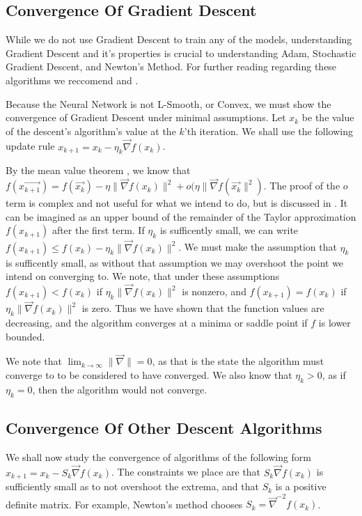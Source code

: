 \documentclass[10pt]{article}
\begin{document}
\subsection{Convergence Of Gradient Descent}
While we do not use Gradient Descent to train any of the models, understanding Gradient Descent and it's properties is crucial to understanding Adam, Stochastic Gradient Descent, and Newton's Method. For further reading regarding these algorithms we reccomend \cite{recht-wright}  and \cite{wikipediacontributors-2019-newtons}.

Because the Neural Network is not L-Smooth\cite{lipschitz}, or Convex, we must show the convergence of Gradient Descent under minimal assumptions. Let $x_k$ be the value of the descent's algorithm's value at the $k$'th iteration. We shall use the following update rule $x_{k+1} = x_k - \eta_k\vec{\nabla}f(x_k)$.


By the mean value theorem \cite{wikipediacontributors-2019-mean}, we know that $f(\vec{x_{k+1}}) = f(\vec{x_k}) - \eta \|\vec{\nabla}f(x_k)\|^2 + o(\eta\|\vec{\nabla}f(\vec{x_k}\|^2)$. The proof of the $o$ term is complex and not useful for what we intend to do, but is discussed in . It can be imagined as an upper bound of the remainder of the Taylor approximation $f(x_{k+1})$ after the first term. If $\eta_k$ is sufficently small, we can write $f(x_{k+1}) \leq f(x_k) - \eta_k \|\vec{\nabla}f(x_k)\|^2$. We must make the assumption that $\eta_k$ is sufficently small, as without that assumption we may overshoot the point we intend on converging to. We note, that under these assumptions $f(x_{k+1}) < f(x_k)$ if $\eta_k \|\vec{\nabla}f(x_k)\|^2$ is nonzero, and $f(x_{k+1}) = f(x_k)$ if $\eta_k \|\vec{\nabla}f(x_k)\|^2$ is zero. Thus we have shown that the function values are decreasing, and the algorithm converges at a minima or saddle point if $f$ is lower bounded.

We note that $\lim_{k \to \infty} \|\vec{\nabla}\| = 0$, as that is the state the algorithm must converge to to be considered to have converged.
We also know that $\eta_k > 0$, as if $\eta_k = 0$, then the algorithm would not converge.

\subsection{Convergence Of Other Descent Algorithms}

We shall now study the convergence of algorithms of the following form $x_{k+1} = x_k - S_k\vec{\nabla}f(x_k)$. The constraints we place are that $S_k\vec{\nabla}f(x_k)$ is sufficiently small as to not overshoot the extrema, and that $S_k$ is a positive definite matrix. For example, Newton's method chooses $S_k = \vec{\nabla}^{-2}f(x_k)$.
\end{document}
